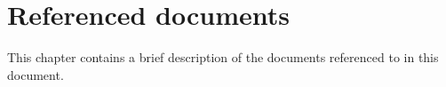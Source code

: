 \chapter{Referenced documents}
This chapter contains a brief description of the documents referenced to in this document.

\begin{table}[H]  
\centering
{}
\caption {Referenced Documents.} 
\label{tab:table_ReferencedDocuments} 
\end{table} 

